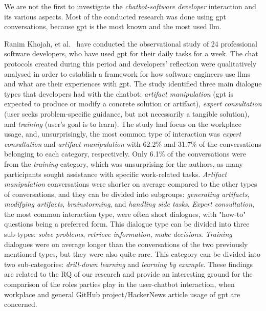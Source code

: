 We are not the first to investigate the \textit{chatbot-software developer} interaction and its various aspects. Most of the conducted research was done using \gls{gpt} conversations, because \gls{gpt} is the most known and the most used \gls{llm}. 

Ranim Khojah, et al.~\cite{khojah2024code} have conducted the observational study of 24 professional software developers, who have used \gls{gpt} for their daily tasks for a week. The chat protocols created during this period and developers' reflection were qualitatively analysed in order to establish a framework for how software engineers use \glspl{llm} and what are their experiences with \gls{gpt}. The study identified three main dialogue types that developers had with the chatbot: \textit{artifact manipulation} (\gls{gpt} is expected to produce or modify a concrete solution or artifact), \textit{expert consultation} (user seeks problem-specific guidance, but not necessarily a tangible solution), and \textit{training} (user's goal is to learn). The study had focus on the workplace usage, and, unsurprisingly, the most common type of interaction was \textit{expert consultation} and \textit{artifact manipulation} with 62.2\% and 31.7\% of the conversations belonging to each category, respectively. Only 6.1\% of the conversations were from the \textit{training} category, which was unsurprising for the authors, as many participants sought assistance with specific work-related tasks. \textit{Artifact manipulation} conversations were shorter on average compared to the other types of conversations, and they can be divided into subgroups: \textit{generating artifacts}, \textit{modifying artifacts}, \textit{brainstorming}, and \textit{handling side tasks}. \textit{Expert consultation}, the most common interaction type, were often short dialogues, with "how-to" questions being a preferred form. This dialogue type can be divided into three sub-types: \textit{solve problems}, \textit{retrieve information}, \textit{make decisions}. \textit{Training} dialogues were on average longer than the conversations of the two previously mentioned types, but they were also quite rare. This category can be divided into two sub-categories: \textit{drill-down learning} and \textit{learning by example}. These findings are related to the RQ of our research and provide an interesting ground for the comparison of the roles parties play in the user-chatbot interaction, when workplace and general GitHub project/HackerNews article usage of \gls{gpt} are concerned. 

